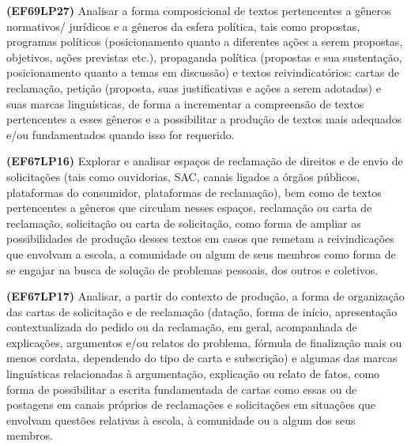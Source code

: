 {\textbf{(EF69LP27)} Analisar a forma composicional de textos
pertencentes a gêneros normativos/ jurídicos e a gêneros da esfera
política, tais como propostas, programas políticos (posicionamento
quanto a diferentes ações a serem propostas, objetivos, ações previstas
etc.), propaganda política (propostas e sua sustentação, posicionamento
quanto a temas em discussão) e textos reivindicatórios: cartas de
reclamação, petição (proposta, suas justificativas e ações a serem
adotadas) e suas marcas linguísticas, de forma a incrementar a
compreensão de textos pertencentes a esses gêneros e a possibilitar a
produção de textos mais adequados e/ou fundamentados quando isso for
requerido.

\textbf{(EF67LP16)} Explorar e analisar espaços de reclamação de
direitos e de envio de solicitações (tais como ouvidorias, SAC, canais
ligados a órgãos públicos, plataformas do consumidor, plataformas de
reclamação), bem como de textos pertencentes a gêneros que circulam
nesses espaços, reclamação ou carta de reclamação, solicitação ou carta
de solicitação, como forma de ampliar as possibilidades de produção
desses textos em casos que remetam a reivindicações que envolvam a
escola, a comunidade ou algum de seus membros como forma de se engajar
na busca de solução de problemas pessoais, dos outros e coletivos.

\textbf{(EF67LP17)} Analisar, a partir do contexto de produção, a forma
de organização das cartas de solicitação e de reclamação (datação, forma
de início, apresentação contextualizada do pedido ou da reclamação, em
geral, acompanhada de explicações, argumentos e/ou relatos do problema,
fórmula de finalização mais ou menos cordata, dependendo do tipo de
carta e subscrição) e algumas das marcas linguísticas relacionadas à
argumentação, explicação ou relato de fatos, como forma de possibilitar
a escrita fundamentada de cartas como essas ou de postagens em canais
próprios de reclamações e solicitações em situações que envolvam
questões relativas à escola, à comunidade ou a algum dos seus membros.

}

